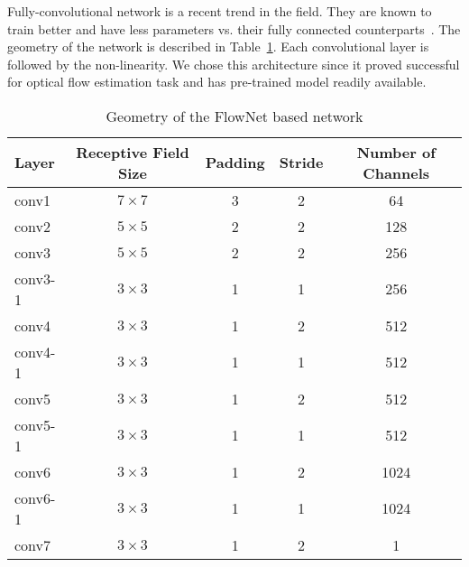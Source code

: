 Fully-convolutional network is a recent trend in the field.  They are
known to train better and have less parameters vs. their fully
connected counterparts~\cite{long2015fully}. The geometry of the
network is described in Table~\ref{tab:flownet_geometry}. Each
convolutional layer is followed by the non-linearity.  We chose this
architecture since it proved successful for optical flow estimation
task and has pre-trained model readily available.

\begin{table}[ht]
  \begin{tabular}{lcccc}
    \toprule
    \textbf{Layer} & \textbf{Receptive Field Size} & \textbf{Padding} & \textbf{Stride} & \textbf{Number of Channels}\\
    \midrule
    conv1&   $7\times 7$& 3& 2&   64\\
    conv2&   $5\times 5$& 2& 2&  128\\
    conv3&   $5\times 5$& 2& 2&  256\\
    conv3-1& $3\times 3$& 1& 1&  256\\
    conv4&   $3\times 3$& 1& 2&  512\\
    conv4-1& $3\times 3$& 1& 1&  512\\
    conv5&   $3\times 3$& 1& 2&  512\\
    conv5-1& $3\times 3$& 1& 1&  512\\
    conv6&   $3\times 3$& 1& 2& 1024\\
    conv6-1& $3\times 3$& 1& 1& 1024\\
    conv7&   $3\times 3$& 1& 2&    1\\
    \hline
  \end{tabular}
  \caption{Geometry of the FlowNet based network}
  \label{tab:flownet_geometry}
\end{table}

